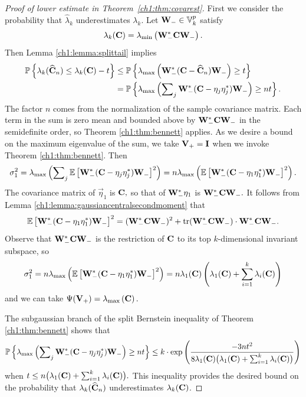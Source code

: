 \begin{proof}[Proof of lower estimate in Theorem~\ref{ch1:thm:covarest}]

First we consider the probability that $\hat{\lambda}_k$ underestimates
$\lambda_k$. Let $\mathbf{W}_- \in \mathbb{V}_{k}^{p}$ satisfy
\[
 \lambda_k(\mathbf{C}) = \lambda_{\mathrm{min}}\left(\mathbf{W}_-^* \mathbf{C} \mathbf{W}_-\right).
\]
Then Lemma \ref{ch1:lemma:splittail} implies
\begin{align*}
 \mathbb{P}\left\{\lambda_k(\widehat{\mathbf{C}}_n) \leq \lambda_k(\mathbf{C}) - t\right\} & \leq
\mathbb{P}\left\{\lambda_{\mathrm{max}}\left(\mathbf{W}_-^* (\mathbf{C} - \widehat{\mathbf{C}}_n) \mathbf{W}_-\right) \geq
t\right\} \\
& = \mathbb{P}\left\{ \lambda_{\mathrm{max}}\left(\sum\nolimits_j \mathbf{W}_-^*(\mathbf{C} -
\mathbf{\eta}_j\mathbf{\eta}_j^* ) \mathbf{W}_-\right) \geq nt\right\}.
\end{align*}
The factor $n$ comes from the normalization of the sample covariance matrix.
Each term in the sum is zero mean and bounded above by
$\mathbf{W}_-^*\mathbf{C}\mathbf{W}_-$ in the semidefinite order, so Theorem
\ref{ch1:thm:bennett} applies. As we desire a bound on the maximum eigenvalue of the
sum, we take $\mathbf{V}_+ = \mathbf{I}$ when we invoke Theorem \ref{ch1:thm:bennett}.
Then 
\[
 \sigma_1^2 = \lambda_{\mathrm{max}}\left( \sum\nolimits_j \mathbb{E}\left[\mathbf{W}_-^*(\mathbf{C} -
\mathbf{\eta}_j\mathbf{\eta}_j^*)\mathbf{W}_-\right]^2 \right) = n
\lambda_{\mathrm{max}}\left(\mathbb{E}\left[\mathbf{W}_-^*(\mathbf{C} -
\mathbf{\eta}_1\mathbf{\eta}_1^*)\mathbf{W}_-\right]^2\right).
\]
The covariance matrix of $\vec{\eta}_1$ is $\mathbf{C},$ so that of
$\mathbf{W}_-^* \mathbf{\eta}_1$ is $\mathbf{W}_-^* \mathbf{C} \mathbf{W}_-.$ It
follows from  Lemma \ref{ch1:lemma:gaussiancentralsecondmoment} that
\[
\mathbb{E}\left[\mathbf{W}_-^*(\mathbf{C} - \mathbf{\eta}_1\mathbf{\eta}_1^*)\mathbf{W}_-\right]^2
= (\mathbf{W}_-^*\mathbf{C}\mathbf{W}_-)^2 + \operatorname{tr}(\mathbf{W}_-^*\mathbf{C}\mathbf{W}_-) \cdot
\mathbf{W}_-^*\mathbf{C}\mathbf{W}_-.
\]
Observe that $\mathbf{W}_-^*\mathbf{C}\mathbf{W}_-$ is the restriction of $\mathbf{C}$ to
its top $k$-dimensional invariant subspace, so
\[
 \sigma_1^2 = n \lambda_{\mathrm{max}}\left(\mathbb{E}\left[\mathbf{W}_-^*(\mathbf{C} -
\mathbf{\eta}_1\mathbf{\eta}_1^*)\mathbf{W}_-\right]^2\right) = n\lambda_1(\mathbf{C}) \left(
\lambda_1(\mathbf{C}) + \sum_{i=1}^k \lambda_i(\mathbf{C}) \right) 
\]
and we can take $\Psi(\mathbf{V}_+) = \lambda_{\mathrm{max}}\left(\mathbf{C}\right).$

The subgaussian branch of the split Bernstein inequality of Theorem
\ref{ch1:thm:bennett} shows that 
\begin{equation*}
 \mathbb{P}\left\{ \lambda_{\mathrm{max}}\left(\sum\nolimits_j \mathbf{W}_-^*(\mathbf{C} -
\mathbf{\eta}_j\mathbf{\eta}_j^* ) \mathbf{W}_-\right) \geq nt\right\} \leq 
 k \cdot \mathrm{exp}\left( \displaystyle \frac{-3nt^2}{8 \lambda_1(\mathbf{C})
\big(\lambda_1(\mathbf{C}) + \sum_{i=1}^k \lambda_i(\mathbf{C}) \big) } \right)
\end{equation*}
when  $t \leq n\big(\lambda_1(\mathbf{C}) + \sum_{i=1}^k \lambda_i(\mathbf{C})\big).$
This inequality provides the desired bound on the probability that
$\lambda_k(\widehat{\mathbf{C}}_n)$ underestimates $\lambda_k(\mathbf{C})$.
\end{proof}

